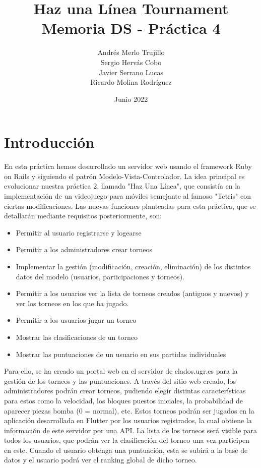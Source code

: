\documentclass{article}
\title{Haz una Línea Tournament\\
\large Memoria DS - Práctica 4}
\author{Andrés Merlo Trujillo\\ Sergio Hervás Cobo\\ Javier Serrano Lucas\\ Ricardo Molina Rodríguez}
\begin{document}
\date{Junio 2022}
\maketitle
\section{Introducción}

En esta práctica hemos desarrollado un servidor web usando el framework Ruby on Rails y siguiendo el patrón Modelo-Vista-Controlador. La idea principal
es evolucionar nuestra práctica 2, llamada "Haz Una Línea", que consistía en la implementación de un videojuego para móviles semejante al famoso "Tetris" con ciertas modificaciones.
Las nuevas funciones planteadas para esta práctica, que se detallarán mediante requisitos posteriormente, son:
\begin{itemize}
\item Permitir al usuario registrarse y logearse
\item Permitir a los administradores crear torneos
\item Implementar la gestión (modificación, creación, eliminación) de los distintos datos del modelo (usuarios, participaciones y torneos).
\item Permitir a los usuarios ver la lista de torneos creados (antiguos y nuevos) y ver los torneos en los que ha jugado.
\item Permitir a los usuarios jugar un torneo
\item Mostrar las clasificaciones de un torneo
\item Mostrar las puntuaciones de un usuario en sus partidas individuales
\end{itemize}


Para ello, se ha creado un portal web en el servidor de clados.ugr.es para la gestión de los torneos y las puntuaciones. A través del sitio web creado,
los administradores podrán crear torneos, pudiendo elegir distintas características para estos como la velocidad, los bloques puestos iniciales, la
 probabilidad de aparecer piezas bomba (0 = normal), etc. Estos torneos podrán ser jugados en la aplicación desarrollada en Flutter por los usuarios registrados,
 la cual obtiene la información de este servidor por una API. La lista de los torneos será visible para todos los usuarios, que podrán ver la clasificación del torneo una
 vez participen en este. Cuando el usuario obtenga una puntuación, esta se subirá a la base de datos y el usuario podrá ver el ranking global de dicho torneo.
 
\end{document}
